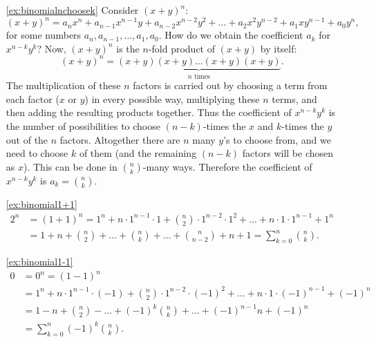 \begin{enumerate}
\item[\ref{ex:binomialnchoosek}]
Consider $(x+y)^n$: 
\[
(x+y)^n = a_n x^n + a_{n-1}x^{n-1}y + a_{n-2}x^{n-2}y^2 + \dots + a_2x^2y^{n-2} + a_1xy^{n-1} + a_0y^n, 
\] 
for some numbers $a_n, a_{n-1}, \dots, a_1, a_0$. 
How do we obtain the coefficient $a_k$ for $x^{n-k}y^k$? 
Now, $(x+y)^n$ is the $n$-fold product of $(x+y)$ by itself: 
\[
(x+y)^n = \underbrace{(x+y) (x+y)  \dots (x+y) (x+y)}_{n\text{ times}}. 
\]
The multiplication of these $n$ factors is carried out by choosing a term from each factor ($x$ or $y$) in every possible way, 
multiplying these $n$ terms, and then adding the resulting products together. 
Thus the coefficient of $x^{n-k}y^k$ is the number of possibilities to choose $(n-k)$-times the $x$ and $k$-times the $y$ out of the $n$ factors. 
Altogether there are $n$ many $y$'s to choose from, 
and we need to choose $k$ of them (and the remaining $(n-k)$ factors will be chosen as $x$). 
This can be done in $\binom{n}{k}$-many ways. 
Therefore the coefficient of $x^{n-k}y^k$ is $a_k=\binom{n}{k}$. 

\item[\ref{ex:binomial1+1}]
\begin{align*}
2^n &= (1+1)^n = 1^n + n \cdot 1^{n-1}\cdot 1 + \binom{n}{2} \cdot 1^{n-2}\cdot 1^2 + \dots + n \cdot 1 \cdot 1^{n-1} + 1^n \\
&= 1 + n + \binom{n}{2} + \dots + \binom{n}{k} + \dots + \binom{n}{n-2} + n + 1 = \sum_{k=0}^n \binom{n}{k}. 
\end{align*}

\item[\ref{ex:binomial1-1}]
\begin{align*}
0 &= 0^n = (1-1)^n \\
&= 1^n + n \cdot 1^{n-1}\cdot (-1) + \binom{n}{2} \cdot 1^{n-2}\cdot (-1)^2 + \dots + n \cdot 1 \cdot (-1)^{n-1} + (-1)^n \\
&= 1 - n  + \binom{n}{2}  - \dots + (-1)^{k} \binom{n}{k} + \dots + (-1)^{n-1} n + (-1)^n \\
&= \sum_{k=0}^n (-1)^k \binom{n}{k}. 
\end{align*}


\end{enumerate}
